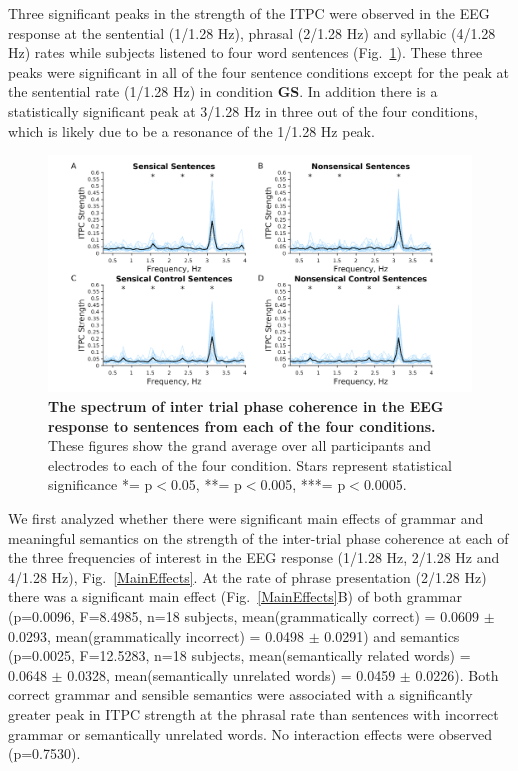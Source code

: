 \documentclass[a4paper,10pt,twoside]{article}
\begin{document}
Three significant peaks in the strength of the ITPC were observed in the EEG response at the sentential (1/1.28 Hz), phrasal (2/1.28 Hz) and syllabic (4/1.28 Hz) rates while subjects listened to four word sentences (Fig.~\ref{Fig1}). These three peaks were significant in all of the four sentence conditions except for the peak at the sentential rate (1/1.28 Hz) in condition \textbf{GS}. In addition there is a statistically significant peak at 3/1.28 Hz in three out of the four conditions, which is likely due to be a resonance of the 1/1.28 Hz peak.

\begin{figure}[tbhp]
\includegraphics[width=\linewidth]{Grand_average_ITPC_per_condition_Grand_Average_ITPC_stats.png}
\caption{\textbf{The spectrum of inter trial phase coherence in the EEG response to sentences from each of the four conditions.} These figures show the grand average over all participants and electrodes to each of the four condition. Stars represent
statistical significance *= p$<$0.05, **= p$<$0.005, ***= p$<$0.0005.}
\label{Fig1}
\end{figure}

We first analyzed whether there were significant main effects of grammar and meaningful semantics on the strength of the inter-trial phase coherence at each of the three frequencies of interest in the EEG response (1/1.28 Hz, 2/1.28 Hz and 4/1.28 Hz), Fig.~\ref{MainEffects}. At the rate of phrase presentation (2/1.28 Hz) there was a significant main effect (Fig.~\ref{MainEffects}B) of both grammar (p=0.0096, F=8.4985, n=18 subjects, mean(grammatically correct) =  0.0609 $\pm$ 0.0293, mean(grammatically incorrect) = 0.0498 $\pm$ 0.0291) and semantics (p=0.0025, F=12.5283, n=18 subjects, mean(semantically related words) = 0.0648 $\pm$ 0.0328, mean(semantically unrelated words) = 0.0459 $\pm$ 0.0226). Both correct grammar and sensible semantics were associated with a significantly greater peak in ITPC strength at the phrasal rate than sentences with incorrect grammar or semantically unrelated words. No interaction effects were observed (p=0.7530).
\end{document}
